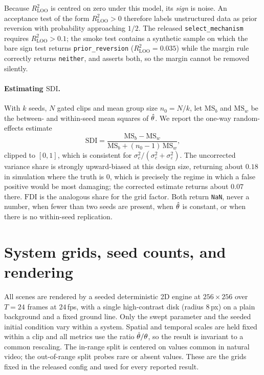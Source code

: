 \documentclass[10pt,twocolumn,letterpaper]{article}
\begin{document}
\begin{remark}
Because $R^2_{\text{LOO}}$ is centred on zero under this model, its
\emph{sign} is noise. An acceptance test of the form $R^2_{\text{LOO}}>0$
therefore labels unstructured data as prior reversion with probability
approaching $1/2$. The released \texttt{select\_mechanism} requires
$R^2_{\text{LOO}}>0.1$; the smoke test contains a synthetic sample on which
the bare sign test returns \texttt{prior\_reversion} ($R^2_{\text{LOO}}=0.035$)
while the margin rule correctly returns \texttt{neither}, and asserts both, so
the margin cannot be removed silently.
\end{remark}

\paragraph{Estimating \texorpdfstring{$\mathrm{SDI}$}{SDI}.}
With $k$ seeds, $N$ gated clips and mean group size $n_0=N/k$, let
$\mathrm{MS}_b$ and $\mathrm{MS}_w$ be the between- and within-seed mean
squares of $\hat{\theta}$. We report the one-way random-effects estimate
\begin{equation*}
\mathrm{SDI}=\frac{\mathrm{MS}_b-\mathrm{MS}_w}
                  {\mathrm{MS}_b+(n_0-1)\,\mathrm{MS}_w},
\end{equation*}
clipped to $[0,1]$, which is consistent for
$\sigma_c^2/(\sigma_c^2+\sigma_\varepsilon^2)$. The uncorrected variance
share is strongly upward-biased at this design size, returning about $0.18$
in simulation where the truth is $0$, which is precisely the regime in which
a false positive would be most damaging; the corrected estimate returns
about $0.07$ there. $\mathrm{FDI}$ is the analogous share for the grid factor.
Both return \texttt{NaN}, never a number, when fewer than two seeds are
present, when $\hat{\theta}$ is constant, or when there is no within-seed
replication.

\section{System grids, seed counts, and rendering}
\label{app:systems}
All scenes are rendered by a seeded deterministic 2D engine at
$256\times256$ over $T{=}24$ frames at $24$\,fps, with a single high-contrast
disk (radius $8$\,px) on a plain background and a fixed ground line. Only the
swept parameter and the seeded initial condition vary within a system.
Spatial and temporal scales are held fixed within a clip and all metrics use
the ratio $\hat{\theta}/\theta$, so the result is invariant to a common
rescaling. The in-range split is centered on values common in natural video;
the out-of-range split probes rare or absent values. These are the grids
fixed in the released config and used for every reported result.
\end{document}
